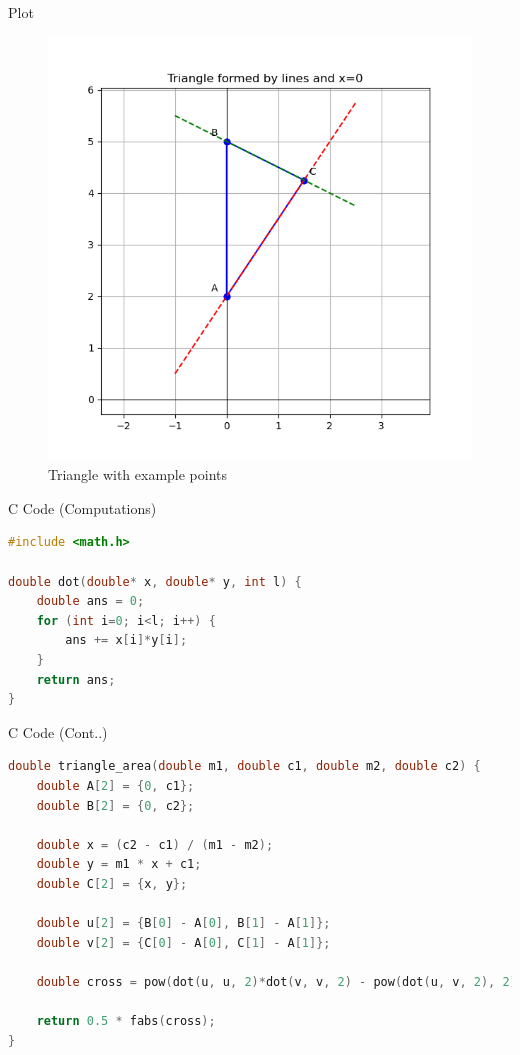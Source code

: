 \documentclass{beamer}
\begin{document}
\begin{frame}[fragile]{Plot}
\begin{figure}[H]\centering
\includegraphics[width=0.8\columnwidth]{figs/plt.png}
\caption{Triangle with example points}
\label{fig:plt}
\end{figure}
\end{frame}


\begin{frame}[fragile]{C Code (Computations)}
\begin{lstlisting}[language=C]
#include <math.h>

double dot(double* x, double* y, int l) {
    double ans = 0;
    for (int i=0; i<l; i++) {
        ans += x[i]*y[i];
    }
    return ans;
}
\end{lstlisting}
\end{frame}

\begin{frame}[fragile]{C Code (Cont..)}
\begin{lstlisting}[language=C]
double triangle_area(double m1, double c1, double m2, double c2) {
    double A[2] = {0, c1};
    double B[2] = {0, c2};
    
    double x = (c2 - c1) / (m1 - m2);
    double y = m1 * x + c1;
    double C[2] = {x, y};
    
    double u[2] = {B[0] - A[0], B[1] - A[1]};
    double v[2] = {C[0] - A[0], C[1] - A[1]};
    
    double cross = pow(dot(u, u, 2)*dot(v, v, 2) - pow(dot(u, v, 2), 2), 0.5);
    
    return 0.5 * fabs(cross);
}
\end{lstlisting}
\end{frame}
\end{document}
